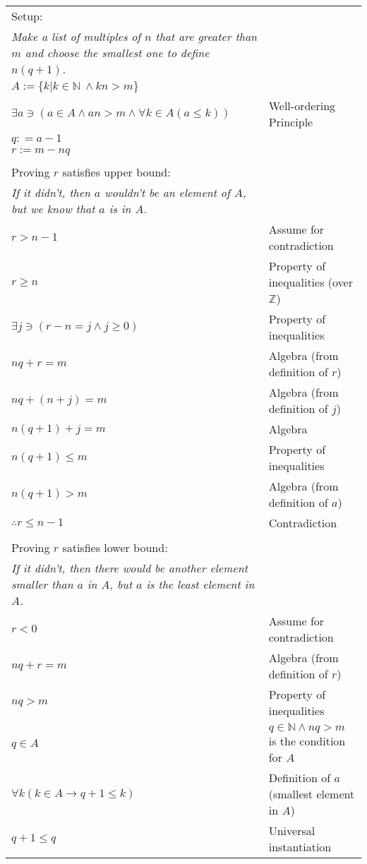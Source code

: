 \item
\begin{tabular}[t]{p{4 in} l}
Setup: \\
\textit{Make a list of multiples of $n$ that are greater than $m$ and choose the smallest one to define $n(q + 1)$.} \\
$A := \{k | k \in \mathbb{N}\ \wedge kn > m \}$ &  \\
$\exists a \ni (a \in A \wedge an > m \wedge \forall k \in A (a \leq k))$ & Well-ordering Principle \\
$q : = a - 1 $ &  \\
$r := m - nq$ &  \\
\\
Proving $r$ satisfies upper bound: \\
\textit{If it didn't, then $a$ wouldn't be an element of $A$, but we know that $a$ is in $A$.} \\
$r > n - 1$ & Assume for contradiction \\
$r \geq n$ & Property of inequalities (over $\mathbb{Z}$) \\
$\exists j \ni (r - n = j \wedge j \geq 0)$ & Property of inequalities \\
$nq + r = m $ & Algebra (from definition of $r$) \\
$nq + (n + j) = m$ & Algebra (from definition of $j$)\\
$n(q + 1) + j = m$ & Algebra \\
$n(q + 1) \leq m$ & Property of inequalities \\
$n(q + 1) > m$ & Algebra (from definition of $a$) \\
$\therefore r \leq n - 1$ & Contradiction \\
\\
Proving $r$ satisfies lower bound: \\
\textit{If it didn't, then there would be another element smaller than $a$ in $A$, but $a$ is the least element in $A$.} \\
$r < 0$ & Assume for contradiction \\
$nq + r = m $ & Algebra (from definition of $r$) \\
$nq > m$ & Property of inequalities \\
$q \in A$ & $q \in \mathbb{N} \wedge nq > m$ is the condition for $A$ \\
$\forall k (k \in A \rightarrow q + 1 \leq k)$ & Definition of $a$ (smallest element in $A$)\\
$q + 1 \leq q$ & Universal instantiation \\

\end{tabular}
